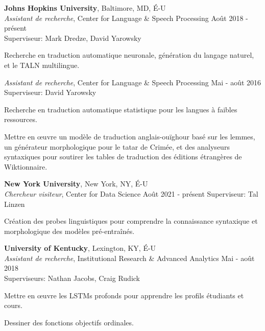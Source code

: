 \documentclass[10pt]{article}
\newcommand{\halfblankline}{\quad\vspace{-0.5\baselineskip}\pagebreak[3]}
\begin{document}
	{\textbf{Johns Hopkins University}},
	Baltimore, MD, É-U\\
		\textit{Assistant de recherche}, Center for Language \& Speech Processing
		\hfill Août 2018 - présent\\
		Superviseur: Mark Dredze, David Yarowsky
		\begin{innerlist}
			\item Recherche en traduction automatique neuronale, génération du langage naturel, et le TALN multilingue.
		\end{innerlist}

		\halfblankline

		\textit{Assistant de recherche}, Center for Language \& Speech Processing%
		\hfill Mai - août 2016\\
		Superviseur: David Yarowsky
		\begin{innerlist}
			\item Recherche en traduction automatique statistique pour les langues à faibles ressources.
			\item Mettre en œuvre un modèle de traduction anglais-ouïghour basé sur les lemmes, un générateur morphologique pour le tatar de Crimée, et des analyseurs syntaxiques pour soutirer les tables de traduction des éditions étrangères de Wiktionnaire.
		\end{innerlist}

	\halfblankline
	
	{\textbf{New York University}},
	New York, NY, É-U\\
	\textit{Chercheur visiteur}, Center for Data Science
	\hfill Août 2021 - présent
	Superviseur: Tal Linzen
	\begin{innerlist}
		\item Création des probes linguistiques pour comprendre la connaissance syntaxique et morphologique des modèles pré-entraînés.
	\end{innerlist}

	\halfblankline

	{\textbf{University of Kentucky}},
	Lexington, KY, É-U\\
		\textit{Assistant de recherche}, Institutional Research \& Advanced Analytics
		\hfill Mai - août 2018\\
		Superviseurs: Nathan Jacobs, Craig Rudick
		\begin{innerlist}
			\item Mettre en œuvre les LSTMs profonds pour apprendre les profils étudiants et cours.
			\item Dessiner des fonctions objectifs ordinales.
		\end{innerlist}
\end{document}
